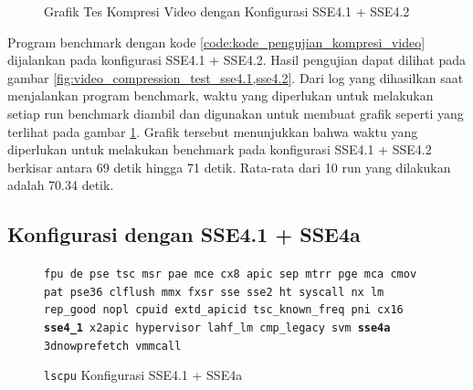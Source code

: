 \begin{figure}
    \centering
    \caption{Grafik Tes Kompresi Video dengan Konfigurasi SSE4.1 + SSE4.2}
    \label{fig:video_compression_test_sse4.1,sse4.2_graph}
\end{figure}

Program benchmark dengan kode \ref{code:kode_pengujian_kompresi_video} dijalankan pada konfigurasi SSE4.1 + SSE4.2. Hasil pengujian dapat dilihat pada gambar \ref{fig:video_compression_test_sse4.1,sse4.2}. Dari log yang dihasilkan saat menjalankan program benchmark, waktu yang diperlukan untuk melakukan setiap run benchmark diambil dan digunakan untuk membuat grafik seperti yang terlihat pada gambar \ref{fig:video_compression_test_sse4.1,sse4.2_graph}. Grafik tersebut menunjukkan bahwa waktu yang diperlukan untuk melakukan benchmark pada konfigurasi SSE4.1 + SSE4.2 berkisar antara 69 detik hingga 71 detik. Rata-rata dari 10 run yang dilakukan adalah 70.34 detik.

\subsection{Konfigurasi dengan SSE4.1 + SSE4a}
\begin{figure}
    \texttt{fpu de pse tsc msr pae mce cx8 apic sep mtrr pge mca cmov pat pse36 clflush mmx fxsr sse sse2 ht syscall nx lm rep\_good nopl cpuid extd\_apicid tsc\_known\_freq pni cx16 \textbf{sse4\_1} x2apic hypervisor lahf\_lm cmp\_legacy svm \textbf{sse4a} 3dnowprefetch vmmcall}
    \caption{\texttt{lscpu} Konfigurasi SSE4.1 + SSE4a}
    \label{fig:lscpu_video_compression_test_sse4.1,sse4a}
\end{figure}

